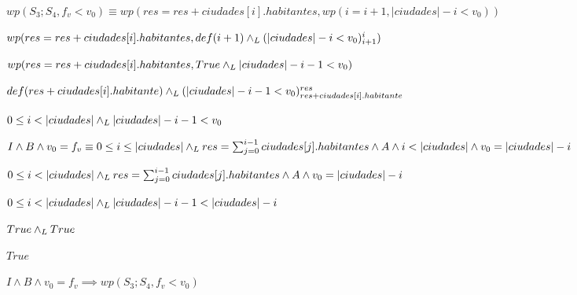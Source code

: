 \documentclass[10pt,a4paper]{article}
\begin{document}
$wp(S_{3};S_{4}, f_{v} < v_{0}) \equiv wp(res = res + ciudades[i].habitantes, wp(i = i + 1, |ciudades| - i < v_{0}))$ \equiv \par
\vspace{5px}
$wp(res = res + ciudades[i].habitantes, def(i+1) \land _L (|ciudades| - i < v_{0})_{i+1}^{i}) $ \equiv \par
\vspace{5px}
$wp(res = res + ciudades[i].habitantes, True \land _L |ciudades| - i - 1 < v_{0})$ \equiv \par
\vspace{5px}
$def(res + ciudades[i].habitante) \land _L (|ciudades| - i - 1 < v_{0})_{res + ciudades[i].habitante}^{res}$ \equiv \par
\vspace{5px}
$0 \leq i < |ciudades| \land _L |ciudades| - i - 1 < v_{0}$ \equiv \par
\vspace{20px}
$I \wedge  B \wedge v_{0}=f_{v} \equiv 0 \leq i \leq |ciudades| \land _L res = \sum_{j=0}^{i-1} ciudades[j].habitantes \wedge A \wedge i < |ciudades| \wedge v_{0}=|ciudades| - i$ \equiv \par
\begin{center}
    $0 \leq i < |ciudades| \land _L res = \sum_{j=0}^{i-1} ciudades[j].habitantes \wedge A \wedge v_{0}=|ciudades| - i$ \implies \par
    \vspace{5px}
    $0 \leq i < |ciudades| \land _L |ciudades| - i - 1 < |ciudades| - i$ \equiv \par
    \vspace{5px}
    $True \land _L True$ \equiv \par
    \vspace{5px}
    $True$ \par
    \vspace{5px}
    $I \wedge  B \wedge v_{0}=f_{v} \implies wp(S_{3};S_{4}, f_{v} < v_{0})$
\end{center}
\end{document}
